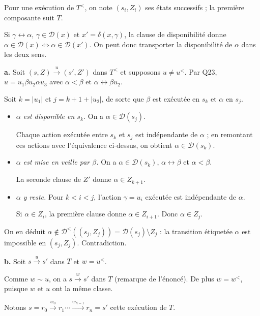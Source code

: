 \documentclass[11pt,a4paper]{article}
\newcommand{\equationajustee}[1]{%
  \sbox{\boiteequation}{$\displaystyle #1$}%
  \ifdim\wd\boiteequation>\linewidth
    \[\resizebox{\linewidth}{!}{\usebox{\boiteequation}}\]%
  \else
    \[#1\]%
  \fi}
\begin{document}
Pour une exécution de \(T^<\), on note \((s_i,Z_i)\) ses états successifs ; la première composante suit \(T\).

Si \(\gamma\leftrightarrow\alpha\), \(\gamma\in\mathcal D(x)\) et \(x'=\delta(x,\gamma)\), la clause de disponibilité donne \(\alpha\in\mathcal D(x)\iff\alpha\in\mathcal D(x')\). On peut donc transporter la disponibilité de \(\alpha\) dans les deux sens.

\textbf{a.} Soit \((s,Z)\xrightarrow{u}(s',Z')\) dans \(T^<\) et supposons \(u\neq u^<\). Par Q23, \(u=u_1\beta u_2\alpha u_3\) avec \(\alpha<\beta\) et \(\alpha\leftrightarrow\beta u_2\).

Soit \(k=|u_1|\) et \(j=k+1+|u_2|\), de sorte que \(\beta\) est exécutée en \(s_k\) et \(\alpha\) en \(s_j\).

\begin{itemize}
\item
  \emph{\(\alpha\) est disponible en \(s_k\).} On a \(\alpha\in\mathcal D(s_j)\).

  Chaque action exécutée entre \(s_k\) et \(s_j\) est indépendante de \(\alpha\) ; en remontant ces actions avec l'équivalence ci-dessus, on obtient \(\alpha\in\mathcal D(s_k)\).
\item
  \emph{\(\alpha\) est mise en veille par \(\beta\).} On a \(\alpha\in\mathcal D(s_k)\), \(\alpha\leftrightarrow\beta\) et \(\alpha<\beta\).

  La seconde clause de \(Z'\) donne \(\alpha\in Z_{k+1}\).
\item
  \emph{\(\alpha\) y reste.} Pour \(k<i<j\), l'action \(\gamma=u_i\) exécutée est indépendante de \(\alpha\).

  Si \(\alpha\in Z_i\), la première clause donne \(\alpha\in Z_{i+1}\). Donc \(\alpha\in Z_j\).
\end{itemize}

On en déduit \(\alpha\notin\mathcal D^<((s_j,\allowbreak Z_j))=\mathcal D(s_j)\setminus Z_j\) : la transition étiquetée \(\alpha\) est impossible en \((s_j,Z_j)\). Contradiction.

\equationajustee{\boxed{(s,Z)\xrightarrow{u}(s',Z') \text{ dans } T^< \implies u=u^<}}

\textbf{b.} Soit \(s\xrightarrow{u}s'\) dans \(T\) et \(w=u^<\).

Comme \(w\sim u\), on a \(s\xrightarrow{w}s'\) dans \(T\) (remarque de l'énoncé). De plus \(w=w^<\), puisque \(w\) et \(u\) ont la même classe.

Notons \(s=r_0\xrightarrow{w_0}r_1\cdots\xrightarrow{w_{n-1}}r_n=s'\) cette exécution de \(T\).
\end{document}
